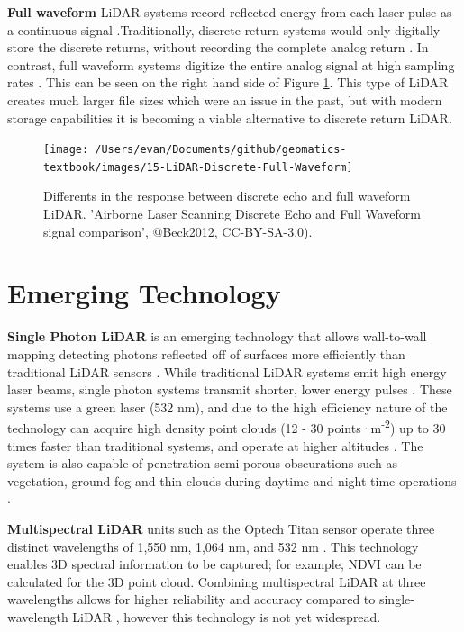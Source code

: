 \documentclass[
]{book}
\begin{document}
\textbf{Full waveform} LiDAR systems record reflected energy from each laser pulse as a continuous signal \citep{White2013}.Traditionally, discrete return systems would only digitally store the discrete returns, without recording the complete analog return \citep{UFGeomatics-FortLauderdale2016c}. In contrast, full waveform systems digitize the entire analog signal at high sampling rates \citep{UFGeomatics-FortLauderdale2016c}. This can be seen on the right hand side of Figure \ref{fig:15-LiDAR-Discrete-Full-Waveform}. This type of LiDAR creates much larger file sizes which were an issue in the past, but with modern storage capabilities it is becoming a viable alternative to discrete return LiDAR.

\begin{figure}
\texttt{[image: /Users/evan/Documents/github/geomatics-textbook/images/15-LiDAR-Discrete-Full-Waveform]} \caption{Differents in the response between discrete echo and full waveform LiDAR. 'Airborne Laser Scanning Discrete Echo and Full Waveform signal comparison', @Beck2012, CC-BY-SA-3.0).}\label{fig:15-LiDAR-Discrete-Full-Waveform}
\end{figure}

\hypertarget{emerging-technology}{%
\section{Emerging Technology}\label{emerging-technology}}

\textbf{Single Photon LiDAR} is an emerging technology that allows wall-to-wall mapping detecting photons reflected off of surfaces more efficiently than traditional LiDAR sensors \citep{Swatantran2016}. While traditional LiDAR systems emit high energy laser beams, single photon systems transmit shorter, lower energy pulses \citep{Swatantran2016}. These systems use a green laser (532 nm), and due to the high efficiency nature of the technology can acquire high density point clouds (12 - 30 points·m\textsuperscript{-2}) up to 30 times faster than traditional systems, and operate at higher altitudes \citep{Swatantran2016}. The system is also capable of penetration semi-porous obscurations such as vegetation, ground fog and thin clouds during daytime and night-time operations \citep{Swatantran2016}.

\textbf{Multispectral LiDAR} units such as the Optech Titan sensor operate three distinct wavelengths of 1,550 nm, 1,064 nm, and 532 nm \citep{Morsy2017}. This technology enables 3D spectral information to be captured; for example, NDVI can be calculated for the 3D point cloud. Combining multispectral LiDAR at three wavelengths allows for higher reliability and accuracy compared to single-wavelength LiDAR \citep{Morsy2017}, however this technology is not yet widespread.
\end{document}
